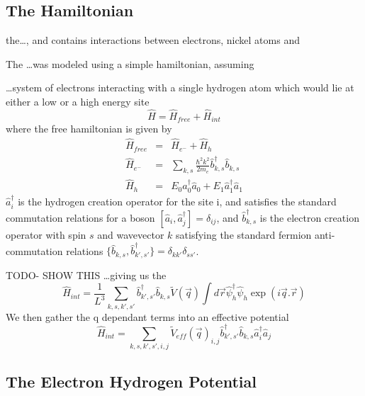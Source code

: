 \subsection{The Hamiltonian}
the\ldots, and contains interactions between
electrons, nickel atoms and


The \ldots was modeled using a simple
hamiltonian, assuming

\ldots system of electrons interacting with
a single hydrogen atom which would lie at
either a low or a high energy site
\begin{equation}
    \hat{H} = \hat{H}_{free} + \hat{H}_{int}
\end{equation}
where the free hamiltonian is given by
\begin{eqnarray}
    \hat{H}_{free} &=& \hat{H}_{e^-} + \hat{H}_{h}\\
    \hat{H}_{e^-} &=& \sum_{k, s}
    \frac{\hbar^2 k^2}{2m_e} \hat{b}^\dagger_{k, s} \hat{b}_{k, s}\\
    \hat{H}_{h} &=&
    E_0 \hat{a}^\dagger_0 \hat{a}_0
    + E_1 \hat{a}^\dagger_1 \hat{a}_1
\end{eqnarray}
\(\hat{a}^\dagger_i\) is the hydrogen creation
operator for the site i, and satisfies the standard commutation
relations for a boson \(\left[ \hat{a}_i, \hat{a}^\dagger_j \right] = \delta_{ij}\),
and \(\hat{b}^\dagger_{k, s}\) is the electron creation operator
with spin \(s\) and wavevector \(k\) satisfying the standard
fermion anti-commutation relations
\( \{ \hat{b}_{k, s}, \hat{b}^\dagger_{k', s'} \} = \delta_{k k'} \delta_{s s'}\).

TODO- SHOW THIS
\ldots giving us the
\begin{equation}
    \hat{H}_{int} = \frac{1}{L^3}\sum_{k,s,k',s'}\hat{b}^\dagger_{k',s'}\hat{b}_{k,s}\tilde{V}(\vec{q})\int{d\vec{r}
    \hat{\psi}_h^{\dagger}\hat{\psi}_h \exp(i\vec{q}.\vec{r})}
\end{equation}
We then gather the q dependant terms into
an effective potential
\begin{equation}
    \hat{H}_{int} = \sum_{k,s,k',s',i,j}
    {\tilde{V}_{eff}(\vec{q})}_{i,j}
    \hat{b}^\dagger_{k',s'}\hat{b}_{k,s}
    \hat{a}^\dagger_{i}\hat{a}_{j}
    \label{eqn:interaction hamiltonian in k}
\end{equation}

\subsection{The Electron Hydrogen Potential}

